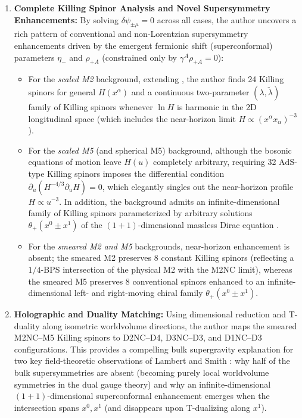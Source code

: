\documentclass[11pt]{article}
\begin{document}
\begin{enumerate}
    \item \textbf{Complete Killing Spinor Analysis and Novel Supersymmetry Enhancements:} By solving $\delta\psi_{\pm\mu} = 0$ across all cases, the author uncovers a rich pattern of conventional and non-Lorentzian supersymmetry enhancements driven by the emergent fermionic shift (superconformal) parameters $\eta_-$ and $\rho_{+A}$ (constrained only by $\gamma^A \rho_{+A} = 0$):
    \begin{itemize}
        \item For the \emph{scaled M2} background, extending \cite{Bergshoeff:2024nin}, the author finds 24 Killing spinors for general $H(x^\alpha)$ and a continuous two-parameter $(\lambda,\tilde\lambda)$ family of Killing spinors whenever $\ln H$ is harmonic in the 2D longitudinal space (which includes the near-horizon limit $H \propto (x^\alpha x_\alpha)^{-3}$).
        \item For the \emph{scaled M5} (and spherical M5) background, although the bosonic equations of motion leave $H(u)$ completely arbitrary, requiring 32 $\mathrm{AdS}$-type Killing spinors imposes the differential condition $\partial_u(H^{-4/3}\partial_u H) = 0$, which elegantly singles out the near-horizon profile $H \propto u^{-3}$. In addition, the background admits an infinite-dimensional family of Killing spinors parameterized by arbitrary solutions $\theta_+(x^0 \pm x^1)$ of the $(1+1)$-dimensional massless Dirac equation \cite{Blair:2020gng,Hampton:2026}.
        \item For the \emph{smeared M2 and M5} backgrounds, near-horizon enhancement is absent; the smeared M2 preserves 8 constant Killing spinors (reflecting a $1/4$-BPS intersection of the physical M2 with the M2NC limit), whereas the smeared M5 preserves 8 conventional spinors enhanced to an infinite-dimensional left- and right-moving chiral family $\theta_+(x^0 \pm x^1)$.
    \end{itemize}

    \item \textbf{Holographic and Duality Matching:} Using dimensional reduction and T-duality along isometric worldvolume directions, the author maps the smeared M2NC--M5 Killing spinors to D2NC--D4, D3NC--D3, and D1NC--D3 configurations. This provides a compelling bulk supergravity explanation for two key field-theoretic observations of Lambert and Smith \cite{Lambert:2024yjk,Lambert:2024ncn}: why half of the bulk supersymmetries are absent (becoming purely local worldvolume symmetries in the dual gauge theory) and why an infinite-dimensional $(1+1)$-dimensional superconformal enhancement emerges when the intersection spans $x^0, x^1$ (and disappears upon T-dualizing along $x^1$).
\end{enumerate}
\end{document}
